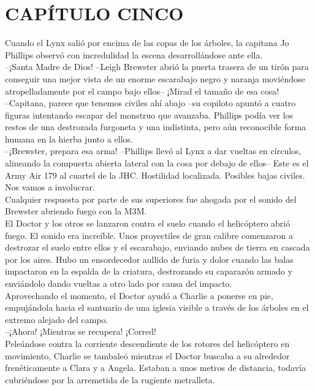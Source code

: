 \chapter*{CAPÍTULO CINCO}
Cuando el Lynx salió por encima de las copas de los árboles, la capitana
Jo Phillips observó con incredulidad la escena desarrollándose ante
ella.\\
--¡Santa Madre de Dios! --Leigh Brewster abrió la puerta trasera de un
tirón para conseguir una mejor vista de un enorme escarabajo negro y
naranja moviéndose atropelladamente por el campo bajo ellos-- ¡Mirad el
tamaño de esa cosa!\\
--Capitana, parece que tenemos civiles ahí abajo --su copiloto apuntó a
cuatro figuras intentando escapar del monstruo que avanzaba. Phillips
podía ver los restos de una destrozada furgoneta y una indistinta, pero
aún reconocible forma humana en la hierba junto a ellos.\\
--¡Brewster, prepara esa arma! --Phillips llevó al Lynx a dar vueltas en
círculos, alineando la compuerta abierta lateral con la cosa por debajo
de ellos-- Este es el Army Air 179 al cuartel de la JHC. Hostilidad
localizada. Posibles bajas civiles. Nos vamos a involucrar.\\
Cualquier respuesta por parte de sus superiores fue ahogada por el
sonido del Brewster abriendo fuego con la M3M.\\[2\baselineskip]El
Doctor y los otros se lanzaron contra el suelo cuando el helicóptero
abrió fuego. El sonido era increíble. Unos proyectiles de gran calibre
comenzaron a destrozar el suelo entre ellos y el escarabajo, enviando
nubes de tierra en cascada por los aires. Hubo un ensordecedor aullido
de furia y dolor cuando las balas impactaron en la espalda de la
criatura, destrozando su caparazón armado y enviándolo dando vueltas a
otro lado por causa del impacto.\\
Aprovechando el momento, el Doctor ayudó a Charlie a ponerse en pie,
empujándola hacia el santuario de una iglesia visible a través de los
árboles en el extremo alejado del campo.\\
--¡Ahora! ¡Mientras se recupera! ¡Corred!\\
Peleándose contra la corriente descendiente de los rotores del
helicóptero en movimiento, Charlie se tambaleó mientras el Doctor
buscaba a su alrededor frenéticamente a Clara y a Angela. Estaban a unos
metros de distancia, todavía cubriéndose por la arremetida de la
rugiente metralleta.\\
